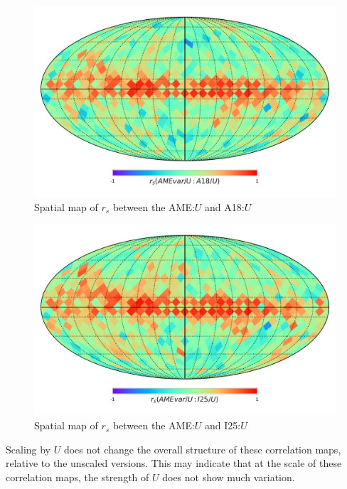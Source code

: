       \begin{figure}
        \includegraphics[width=\textwidth/2]{../Plots/Allsky_Corr/UNorm/Spearman_Map_nside8_AMEvartoA18.pdf}
        \centering
        \caption{Spatial map of $r_{s}$ between the AME:$U$ and A18:$U$}
        \label{fig:Spearman_Map_nside8_AMEvartoIR_UNorm_A18}
      \end{figure}
    \begin{figure}
         \includegraphics[width=\textwidth/2]{../Plots/Allsky_Corr/UNorm/Spearman_Map_nside8_AMEvartoI25.pdf}
         \centering
         \caption{Spatial map of $r_{s}$ between the AME:$U$ and I25:$U$}
         \label{fig:Spearman_Map_nside8_AMEvartoIR_UNorm_I25}
    \end{figure}
  Scaling by $U$ does not change the overall structure of these correlation maps, relative to the unscaled versions. This may indicate that at the scale of these correlation maps, the strength of $U$ does not show much variation.

